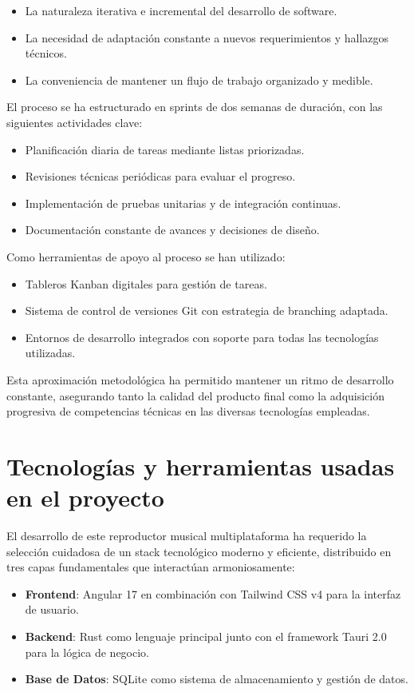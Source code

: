 \documentclass[11pt, a4paper]{article}
\begin{document}
\begin{itemize}
    \item La naturaleza iterativa e incremental del desarrollo de software.
    \item La necesidad de adaptación constante a nuevos requerimientos y hallazgos técnicos.
    \item La conveniencia de mantener un flujo de trabajo organizado y medible.
\end{itemize}

El proceso se ha estructurado en sprints de dos semanas de duración, con las siguientes actividades clave:
\begin{itemize}
    \item Planificación diaria de tareas mediante listas priorizadas.
    \item Revisiones técnicas periódicas para evaluar el progreso.
    \item Implementación de pruebas unitarias y de integración continuas.
    \item Documentación constante de avances y decisiones de diseño.
\end{itemize}

Como herramientas de apoyo al proceso se han utilizado:
\begin{itemize}
    \item Tableros Kanban digitales para gestión de tareas.
    \item Sistema de control de versiones Git con estrategia de branching adaptada.
    \item Entornos de desarrollo integrados con soporte para todas las tecnologías utilizadas.
\end{itemize}

Esta aproximación metodológica ha permitido mantener un ritmo de desarrollo constante, asegurando tanto la calidad del producto final como la adquisición progresiva de competencias técnicas en las diversas tecnologías empleadas.

\section{Tecnologías y herramientas usadas en el proyecto}

El desarrollo de este reproductor musical multiplataforma ha requerido la selección cuidadosa de un stack tecnológico moderno y eficiente, distribuido en tres capas fundamentales que interactúan armoniosamente:

\begin{itemize}
    \item \textbf{Frontend}: Angular 17 en combinación con Tailwind CSS v4 para la interfaz de usuario.
    \item \textbf{Backend}: Rust como lenguaje principal junto con el framework Tauri 2.0 para la lógica de negocio.
    \item \textbf{Base de Datos}: SQLite como sistema de almacenamiento y gestión de datos.
\end{itemize}
\end{document}
